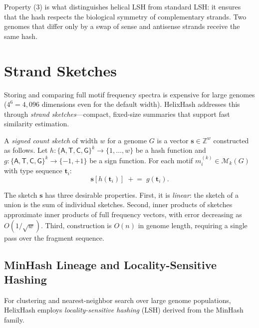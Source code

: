 Property (3) is what distinguishes helical LSH from standard LSH: it ensures that the hash respects the biological symmetry of complementary strands. Two genomes that differ only by a swap of sense and antisense strands receive the same hash.

\section{Strand Sketches}
\label{sec:strand-sketches}

Storing and comparing full motif frequency spectra is expensive for large genomes ($4^6 = 4{,}096$ dimensions even for the default width). HelixHash addresses this through \emph{strand sketches}---compact, fixed-size summaries that support fast similarity estimation.

\begin{definition}
\label{def:count-sketch}
A \emph{signed count sketch} of width $w$ for a genome $G$ is a vector $\mathbf{s} \in \mathbb{Z}^w$ constructed as follows. Let $h: \{\mathsf{A}, \mathsf{T}, \mathsf{C}, \mathsf{G}\}^k \to \{1, \ldots, w\}$ be a hash function and $g: \{\mathsf{A}, \mathsf{T}, \mathsf{C}, \mathsf{G}\}^k \to \{-1, +1\}$ be a sign function. For each motif $m_i^{(k)} \in \mathcal{M}_k(G)$ with type sequence $\mathbf{t}_i$:
\begin{equation}
\mathbf{s}[h(\mathbf{t}_i)] \;\mathrel{+}= \; g(\mathbf{t}_i).
\end{equation}
\end{definition}

The sketch $\mathbf{s}$ has three desirable properties. First, it is \emph{linear}: the sketch of a union is the sum of individual sketches. Second, inner products of sketches approximate inner products of full frequency vectors, with error decreasing as $O(1/\sqrt{w})$. Third, construction is $O(n)$ in genome length, requiring a single pass over the fragment sequence.

\subsection{MinHash Lineage and Locality-Sensitive Hashing}

For clustering and nearest-neighbor search over large genome populations, HelixHash employs \emph{locality-sensitive hashing} (LSH) derived from the MinHash family.

